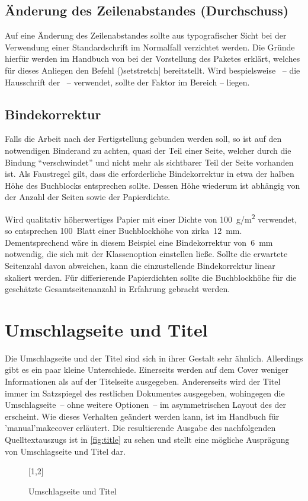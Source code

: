 \documentclass[%
  english,ngerman,%
  cdgeometry=no,DIV=12,%
  cd=false,cdfont=false,cdtitle=true,%
  headings=normal,%
  automark,%
  listof=toc,%
]{tudscrartcl}
\begin{document}
\subsection{Änderung des Zeilenabstandes (Durchschuss)}

Auf eine Änderung des Zeilenabstandes sollte aus typografischer Sicht bei der 
Verwendung einer Standardschrift im Normalfall verzichtet werden. Die Gründe 
hierfür werden im Handbuch von \TUDScript bei der Vorstellung des Paketes 
 erklärt, welches für dieses Anliegen den Befehl 
\Macro(){setstretch|} bereitstellt. Wird 
bespielsweise \OpenSans~-- die Hausschrift der \TnUD~-- verwendet, sollte der 
Faktor im Bereich -- liegen.



\subsection{%
  Bindekorrektur%
  \label{sec:bcor}%
}

Falls die Arbeit nach der Fertigstellung gebunden werden soll, so ist auf den 
notwendigen Binderand zu achten, quasi der Teil einer Seite, welcher durch die 
Bindung \enquote{verschwindet} und nicht mehr als sichtbarer Teil der Seite 
vorhanden ist. Als Faustregel gilt, dass die erforderliche Bindekorrektur in 
etwa der halben Höhe des Buchblocks entsprechen sollte. Dessen Höhe wiederum 
ist abhängig von der Anzahl der Seiten sowie der Papierdichte.

Wird qualitativ höherwertiges Papier mit einer Dichte von \SI{100}{g/m^2} 
verwendet, so entsprechen 100~Blatt einer Buchblockhöhe von zirka~\SI{12}{mm}. 
Dementsprechend wäre in diesem Beispiel eine Bindekorrektur von~\SI{6}{mm} 
notwendig, die sich mit der Klassenoption  einstellen ließe. 
Sollte die erwartete Seitenzahl davon abweichen, kann die einzustellende 
Bindekorrektur linear skaliert werden. Für differierende Papierdichten sollte 
die Buchblockhöhe für die geschätzte Gesamtseitenanzahl in Erfahrung gebracht 
werden.



\section{Umschlagseite und Titel}

Die Umschlagseite und der Titel sind sich in ihrer Gestalt sehr ähnlich. 
Allerdings gibt es ein paar kleine Unterschiede. Einerseits werden auf dem 
Cover weniger Informationen als auf der Titelseite ausgegeben. Andererseits 
wird der Titel immer im Satzspiegel des restlichen Dokumentes ausgegeben, 
wohingegen die Umschlagseite~-- ohne weitere Optionen~-- im asymmetrischen 
Layout des \CDs der \TnUD erscheint. Wie dieses Verhalten geändert werden kann, 
ist im Handbuch für \Macro'manual'{makecover} erläutert. Die resultierende 
Ausgabe des nachfolgenden Quelltextauszugs ist in \autoref{fig:title} zu sehen 
und stellt eine mögliche Ausprägung von Umschlagseite und Titel dar.
%
\begin{figure}
[1,2]
\caption{%
  Umschlagseite und Titel%
  \label{fig:title}%
}
\end{figure}
\end{document}
